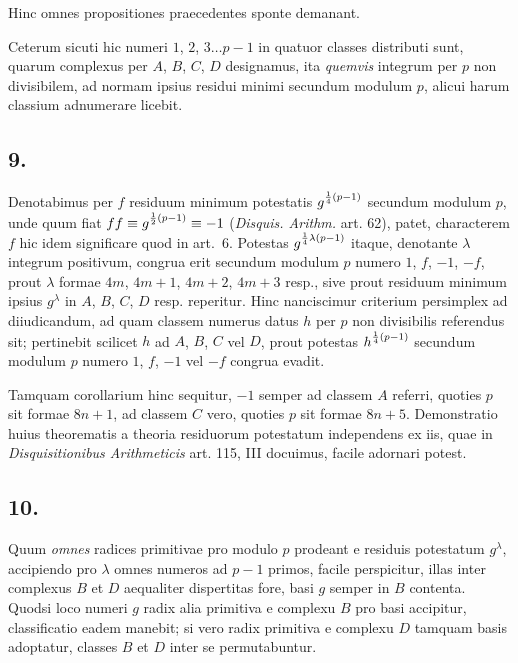 \documentclass[twoside,12pt]{memoir}
\let\oldfrac\frac
\def\frac#1#2{\mathchoice{\tfrac{#1}{#2}}{\oldfrac{#1}{#2}}{\genfrac{}{}{}{2}{#1}{#2\mathstrut}}{\genfrac{}{}{}{3}{#1}{#2\mathstrut}}}
\begin{document}
Hinc omnes propositiones praecedentes sponte demanant.
 
Ceterum sicuti hic numeri \(1\), \(2\), \(3 \ldots p-1\) in quatuor classes distributi sunt, quarum complexus per \(A\), \(B\), \(C\), \(D\) designamus, ita \textit{quemvis} integrum per \(p\) non divisibilem, ad normam ipsius residui minimi secundum modulum \(p\), alicui harum classium adnumerare licebit.

\subsection*{9.}
 
Denotabimus per \(f\) residuum minimum potestatis \(g^{\frac{1}{4}(p-1)}\) secundum modulum \(p\), unde quum fiat \(f f \equiv g^{\frac{1}{2}(p-1)} \equiv-1\) (\textit{Disquis. Arithm.} art. 62), patet, characterem \(f\) hic idem significare quod in art.\ 6. Potestas \(g^{\frac{1}{4} \lambda(p-1)}\) itaque, denotante \(\lambda\) integrum positivum, congrua erit secundum modulum \(p\) numero \(1\), \(f\), \(-1\), \(-f\), prout \(\lambda\) formae \(4 m\), \(4 m+1\), \(4 m+2\), \(4 m+3\) resp., sive prout residuum minimum ipsius \(g^{\lambda}\) in \(A\), \(B\), \(C\), \(D\) resp. reperitur. Hinc nanciscimur criterium persimplex ad diiudicandum, ad quam classem numerus datus \(h\) per \(p\) non divisibilis referendus sit; pertinebit scilicet \(h\) ad \(A\), \(B\), \(C\) vel \(D\), prout potestas \(h^{\frac{1}{4}(p-1)}\) secundum modulum \(p\) numero \(1\), \(f\), \(-1\) vel \(-f\) congrua evadit.
 
Tamquam corollarium hinc sequitur, \(-1\) semper ad classem \(A\) referri, quoties \(p\) sit formae \(8 n+1\), ad classem \(C\) vero, quoties \(p\) sit formae \(8 n+5\). Demonstratio huius theorematis a theoria residuorum potestatum independens ex iis, quae in \textit{Disquisitionibus Arithmeticis} art. 115, III docuimus, facile adornari potest.

\subsection*{10.}
 
Quum \textit{omnes} radices primitivae pro modulo \(p\) prodeant e residuis potestatum \(g^{\lambda}\), accipiendo pro \(\lambda\) omnes numeros ad \(p-1\) primos, facile perspicitur, illas inter complexus \({B}\) et \({D}\) aequaliter dispertitas fore, basi \({g}\) semper in \({B}\) contenta. Quodsi loco numeri \(g\) radix alia primitiva e complexu \(B\) pro basi accipitur, classificatio eadem manebit; si vero radix primitiva e complexu \(D\) tamquam basis adoptatur, classes \(B\) et \(D\) inter se permutabuntur.\pagebreak%
 
\end{document}
